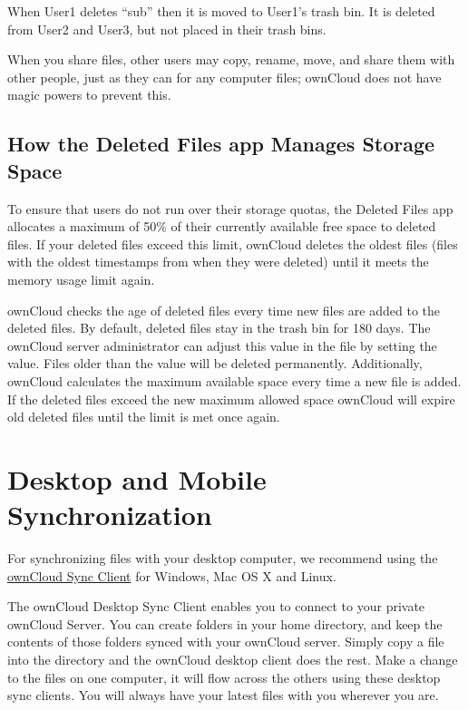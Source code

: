 \documentclass[letterpaper,10pt,english]{sphinxmanual}
\begin{document}
When User1 deletes ``sub'' then it is moved to User1's trash bin. It is
deleted from User2 and User3, but not placed in their trash bins.

When you share files, other users may copy, rename, move, and share them with
other people, just as they can for any computer files; ownCloud does not have
magic powers to prevent this.


\subsection{How the Deleted Files app Manages Storage Space}
\label{files/deleted_file_management:how-the-deleted-files-app-manages-storage-space}
To ensure that users do not run over their storage quotas, the Deleted Files
app allocates a maximum of 50\% of their currently available free space to
deleted files. If your deleted files exceed this limit, ownCloud deletes the
oldest files (files with the oldest timestamps from when they were deleted)
until it meets the memory usage limit again.

ownCloud checks the age of deleted files every time new files are added to the
deleted files. By default, deleted files stay in the trash bin for 180 days. The
ownCloud server administrator can adjust this value in the  file
by setting the  value. Files older than the
 value will be deleted permanently.
Additionally, ownCloud calculates the maximum available space every time a new
file is added. If the deleted files exceed the new maximum allowed space
ownCloud will expire old deleted files until the limit is met once again.


\section{Desktop and Mobile Synchronization}
\label{files/desktop_mobile_sync:desktop-and-mobile-synchronization}\label{files/desktop_mobile_sync::doc}
For synchronizing files with your desktop computer, we recommend using the
\href{https://owncloud.org/sync-client/}{ownCloud Sync Client} for Windows, Mac OS X and Linux.

The ownCloud Desktop Sync Client enables you to connect to your private
ownCloud Server.
You can create folders in your home directory, and keep the contents of those
folders synced with your ownCloud server. Simply copy a file into the directory
and the ownCloud desktop client does the rest. Make a change to the files on one
computer, it will flow across the others using these desktop sync clients.
You will always
have your latest files with you wherever you are.
\end{document}
